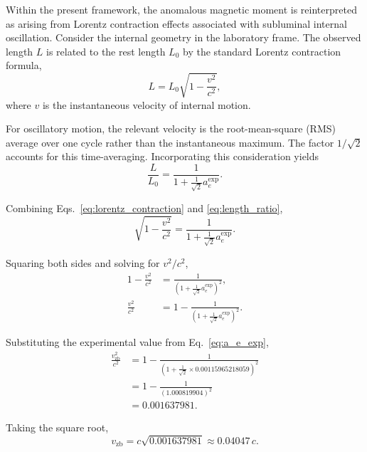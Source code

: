 \documentclass[%
 reprint,
 amsmath,amssymb,
 aps,
 prb,
]{revtex4-2}
\numberwithin{equation}{section}
\begin{document}
Within the present framework, the anomalous magnetic moment is reinterpreted as arising from Lorentz contraction effects associated with subluminal internal oscillation. Consider the internal geometry in the laboratory frame. The observed length $L$ is related to the rest length $L_0$ by the standard Lorentz contraction formula,
\begin{equation}
L = L_0 \sqrt{1 - \frac{v^2}{c^2}},
\label{eq:lorentz_contraction}
\end{equation}
where $v$ is the instantaneous velocity of internal motion.

For oscillatory motion, the relevant velocity is the root-mean-square (RMS) average over one cycle rather than the instantaneous maximum. The factor $1/\sqrt{2}$ accounts for this time-averaging. Incorporating this consideration yields
\begin{equation}
\frac{L}{L_0} = \frac{1}{1 + \frac{1}{\sqrt{2}} a_e^{\mathrm{exp}}}.
\label{eq:length_ratio}
\end{equation}

Combining Eqs.~\eqref{eq:lorentz_contraction} and \eqref{eq:length_ratio},
\begin{equation}
\sqrt{1 - \frac{v^2}{c^2}} = \frac{1}{1 + \frac{1}{\sqrt{2}} a_e^{\mathrm{exp}}}.
\label{eq:combined_relation}
\end{equation}

Squaring both sides and solving for $v^2/c^2$,
\begin{equation}
\begin{aligned}
1 - \frac{v^2}{c^2} &= \frac{1}{\left(1 + \frac{1}{\sqrt{2}} a_e^{\mathrm{exp}}\right)^2}, \\
\frac{v^2}{c^2} &= 1 - \frac{1}{\left(1 + \frac{1}{\sqrt{2}} a_e^{\mathrm{exp}}\right)^2}.
\end{aligned}
\label{eq:velocity_squared}
\end{equation}

Substituting the experimental value from Eq.~\eqref{eq:a_e_exp},
\begin{equation}
\begin{aligned}
\frac{v_{\mathrm{zb}}^2}{c^2} &= 1 - \frac{1}{(1 + \frac{1}{\sqrt{2}} \times 0.001159652 18059)^2} \\
&= 1 - \frac{1}{(1.000819904)^2} \\
&= 0.001637981.
\end{aligned}
\label{eq:v_zb_squared_numerical}
\end{equation}

Taking the square root,
\begin{equation}
v_{\mathrm{zb}} = c \sqrt{0.001637981} \approx 0.04047\,c.
\label{eq:v_zb_result}
\end{equation}
\end{document}
